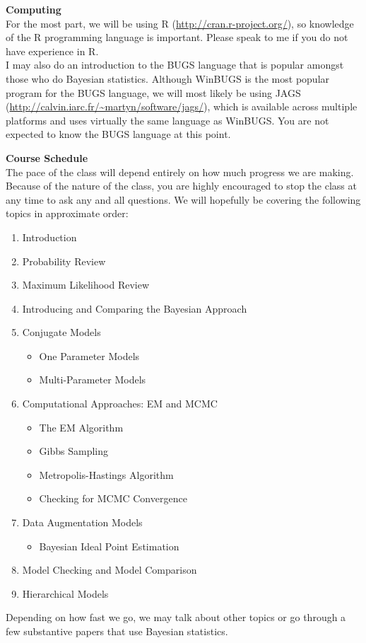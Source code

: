 \documentclass[10pt,a4paper]{article}
\begin{document}
\bigskip

\textbf{Computing} \\

For the most part, we will be using R (\url{http://cran.r-project.org/}), so knowledge of the R programming language is important.  Please speak to me if you do not have experience in R. \\

I may also do an introduction to the BUGS language that is popular amongst those who do Bayesian statistics.  Although WinBUGS is the most popular program for the BUGS language, we will most likely be using JAGS (\url{http://calvin.iarc.fr/~martyn/software/jags/}), which is available across multiple platforms and uses virtually the same language as WinBUGS.  You are not expected to know the BUGS language at this point. \\

\bigskip

\textbf{Course Schedule} \\

The pace of the class will depend entirely on how much progress we are making.  Because of the nature of the class, you are highly encouraged to stop the class at any time to ask any and all questions.  We will hopefully be covering the following topics in approximate order:

\begin{enumerate}
\item Introduction
\item Probability Review
\item Maximum Likelihood Review
\item Introducing and Comparing the Bayesian Approach
\item Conjugate Models
\begin{itemize}
\item One Parameter Models
\item Multi-Parameter Models
\end{itemize}
\item Computational Approaches: EM and MCMC
\begin{itemize}
\item The EM Algorithm
\item Gibbs Sampling 
\item Metropolis-Hastings Algorithm
\item Checking for MCMC Convergence
\end{itemize}
\item Data Augmentation Models
\begin{itemize}
\item Bayesian Ideal Point Estimation
\end{itemize}
\item Model Checking and Model Comparison
\item Hierarchical Models
\end{enumerate}
Depending on how fast we go, we may talk about other topics or go through a few substantive papers that use Bayesian statistics.
\end{document}
